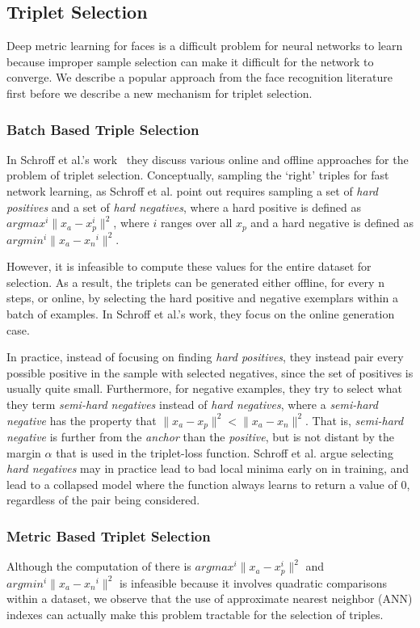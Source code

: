 \subsection{Triplet Selection}
Deep metric learning for faces is a difficult problem for neural networks to learn because improper sample selection can make it difficult for the network to converge.  We describe a popular approach from the face recognition literature first before we describe a new mechanism for triplet selection.

\subsubsection{Batch Based Triple Selection}
In Schroff et al.'s work~\cite{DBLP:conf/cvpr/SchroffKP15} they discuss various online and offline approaches for the problem of triplet selection.  Conceptually, sampling the `right' triples for fast network learning, as Schroff et al. point out requires sampling a set of \textit{hard positives} and a set of \textit{hard negatives}, where a hard positive is defined as $argmax^i \| x_{a} - x_{p}^i \|^2$, where $i$ ranges over all $x_p$ and a hard negative is defined as $argmin^i \| x_{a} - x{_n}^i \|^2$.  

However, it is infeasible to compute these values for the entire dataset for selection.  As a result, the triplets can be generated either offline, for every n steps, or online, by selecting the hard positive and negative exemplars within a batch of examples.  In Schroff et al.'s work, they focus on the online generation case.  

In practice, instead of focusing on finding \textit{hard positives}, they instead pair every possible positive in the sample with selected negatives, since the set of positives is usually quite small.  Furthermore, for negative examples, they try to select what they term \textit{semi-hard negatives} instead of \textit{hard negatives}, where a \textit{semi-hard negative} has the property that $\|x_a - x_p \|^2 < \|x_a - x_n \|^2$.  That is, \textit{semi-hard negative} is further from the \textit{anchor} than the \textit{positive}, but is not distant by the margin $\alpha$ that is used in the triplet-loss function.  Schroff et al. argue selecting \textit{hard negatives} may in practice lead to bad local minima early on in training, and lead to a collapsed model where the function always learns to return a value of 0, regardless of the pair being considered.

\subsubsection{Metric Based Triplet Selection}
Although the computation of there is $argmax^i \| x_{a} - x_{p}^i \|^2$ and $argmin^i \| x_{a} - x{_n}^i \|^2$ is infeasible because it involves quadratic comparisons within a dataset, we observe that the use of approximate nearest neighbor (ANN) indexes can actually make this problem tractable for the selection of triples.  


